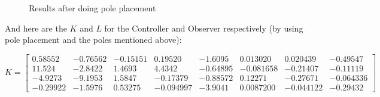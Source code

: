 \documentclass[10pt,a4paper]{article}
\begin{document}
	\begin{figure}[H]
			\centering
            \caption{Results after doing pole placement}
            \label{fig:Q5-xu}
	\end{figure}

And here are the $K$ and $L$ for the Controller and Observer respectively (by using pole placement and the poles mentioned above):

\[ K =
\begin{bmatrix}
   0.58552 & -0.76562 & -0.15151 &  0.19520 & -1.6095 &  0.013020 &  0.020439 & -0.49547 \\
   11.524 & -2.8422 &  1.4693 &  4.4342 & -0.64895 & -0.081658 & -0.21407 & -0.11119 \\
  -4.9273 & -9.1953 &  1.5847 & -0.17379 & -0.88572 &  0.12271 & -0.27671 & -0.064336 \\
  -0.29922 & -1.5976 &  0.53275 & -0.094997 & -3.9041 &  0.0087200 & -0.044122 & -0.29432
\end{bmatrix} \]
\end{document}
